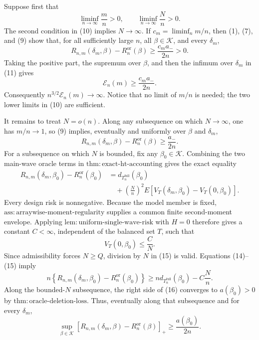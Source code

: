Suppose first that
\[
\liminf_{n\to\infty}\frac mn>0,
\qquad
\liminf_{n\to\infty}\frac Nn>0.
\tag{10}
\]
The second condition in (10) implies \(N\to\infty\).  If \(c_m=\liminf_n m/n\), then (1), (7), and (9) show that, for all sufficiently large \(n\), all \(\beta\in\mathcal K\), and every \(\delta_m\),
\[
R_{n,m}(\delta_m,\beta)-R_n^{\mathrm{or}}(\beta)
\geq \frac{c_m a_-}{2n}>0.
\tag{11}
\]
Taking the positive part, the supremum over \(\beta\), and then the infimum over \(\delta_m\) in (11) gives
\[
\mathcal E_n(m)\geq \frac{c_m a_-}{2n}.
\tag{12}
\]
Consequently \(n^{3/2}\mathcal E_n(m)\to\infty\).  Notice that no limit of \(m/n\) is needed; the two lower limits in (10) are sufficient.

It remains to treat \(N=o(n)\).  Along any subsequence on which \(N\to\infty\), one has \(m/n\to1\), so (9) implies, eventually and uniformly over \(\beta\) and \(\delta_m\),
\[
R_{n,m}(\delta_m,\beta)-R_n^{\mathrm{or}}(\beta)
\geq \frac{a_-}{2n}.
\tag{13}
\]
For a subsequence on which \(N\) is bounded, fix any \(\beta_0\in\mathcal K\).  Combining the two main-wave oracle terms in \(\mathrm{thm{:}exact\text{-}ht\text{-}accounting}\) gives the exact equality
\[
\begin{aligned}
R_{n,m}(\delta_m,\beta_0)-R_n^{\mathrm{or}}(\beta_0)
&=d_{T_n^{\mathrm{full}}}(\beta_0)\\
&\quad+\left(\frac Nn\right)^2E\!\left[
V_T(\delta_m,\beta_0)-V_T(0,\beta_0)
\right].
\end{aligned}
\tag{14}
\]
Every design risk is nonnegative.  Because the model member is fixed, \(\mathrm{ass{:}arraywise\text{-}moment\text{-}regularity}\) supplies a common finite second-moment envelope.  Applying \(\mathrm{lem{:}uniform\text{-}single\text{-}wave\text{-}risk}\) with \(H=0\) therefore gives a constant \(C<\infty\), independent of the balanced set \(T\), such that
\[
V_T(0,\beta_0)\leq \frac CN.
\tag{15}
\]
Since admissibility forces \(N\geq Q\), division by \(N\) in (15) is valid.  Equations (14)--(15) imply
\[
n\left\{R_{n,m}(\delta_m,\beta_0)-R_n^{\mathrm{or}}(\beta_0)\right\}
\geq n d_{T_n^{\mathrm{full}}}(\beta_0)-C\frac Nn.
\tag{16}
\]
Along the bounded-\(N\) subsequence, the right side of (16) converges to \(a(\beta_0)>0\) by \(\mathrm{thm{:}oracle\text{-}deletion\text{-}loss}\).  Thus, eventually along that subsequence and for every \(\delta_m\),
\[
\sup_{\beta\in\mathcal K}
\left[R_{n,m}(\delta_m,\beta)-R_n^{\mathrm{or}}(\beta)\right]_+
\geq \frac{a(\beta_0)}{2n}.
\tag{17}
\]

